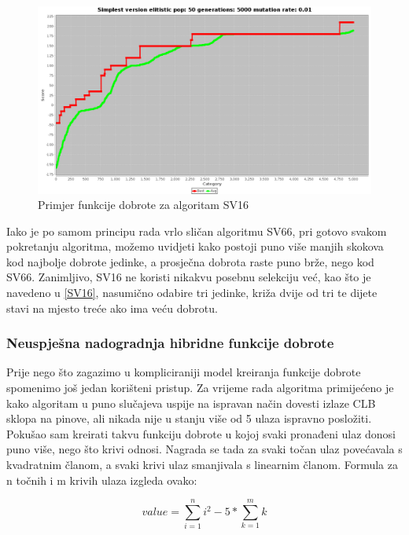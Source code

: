 \documentclass[times, utf8, zavrsni]{fer}
\begin{document}
	\begin{figure}[!htb]
		\centering
		\includegraphics[width=18cm]{slike/SV16Hibrid.png}
		\caption{Primjer funkcije dobrote za algoritam SV16}
		\label{fig:sv16-alg-hibrid}
	\end{figure} 
	
	Iako je po samom principu rada vrlo sličan algoritmu SV66, pri gotovo svakom pokretanju algoritma, možemo uvidjeti kako postoji puno više manjih skokova kod najbolje dobrote jedinke, a prosječna dobrota raste puno brže, nego kod SV66. Zanimljivo, SV16 ne koristi nikakvu posebnu selekciju već, kao što je navedeno u \ref{SV16}, nasumično odabire tri jedinke, križa dvije od tri te dijete stavi na mjesto treće ako ima veću dobrotu. 
	
	\subsubsection{Neuspješna nadogradnja hibridne funkcije dobrote}
	
	Prije nego što zagazimo u kompliciraniji model kreiranja funkcije dobrote spomenimo još jedan korišteni pristup. Za vrijeme rada algoritma primijećeno je kako algoritam u puno slučajeva uspije na ispravan način dovesti izlaze CLB sklopa na pinove, ali nikada nije u stanju više od 5 ulaza ispravno posložiti. Pokušao sam kreirati takvu funkciju dobrote u kojoj svaki pronađeni ulaz donosi puno više, nego što krivi odnosi. Nagrada se tada za svaki točan ulaz povećavala s kvadratnim članom, a svaki krivi ulaz smanjivala s linearnim članom. Formula za n točnih i m krivih ulaza izgleda ovako: 
	
	\begin{equation}
		value=\sum_{i=1}^{n}i^2 - 5\ast \sum_{k=1}^{m}k
	\end{equation}
	
\end{document}
